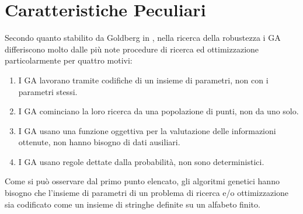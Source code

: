 \section{Caratteristiche Peculiari}
Secondo quanto stabilito da Goldberg in \cite{goldberg1}, nella ricerca della robustezza i GA differiscono molto dalle pi\`u note procedure di ricerca ed ottimizzazione particolarmente per quattro motivi:
\begin{enumerate}
    \item I GA lavorano tramite codifiche di un insieme di parametri, non con i parametri stessi.
    \item I GA cominciano la loro ricerca da una popolazione di punti, non da uno solo.
    \item I GA usano una funzione oggettiva per la valutazione delle informazioni ottenute, non hanno bisogno di dati ausiliari.
    \item I GA usano regole dettate dalla probabilit\`a, non sono deterministici.
\end{enumerate}
Come si pu\`o osservare dal primo punto elencato, gli algoritmi genetici hanno bisogno che l'insieme di parametri di un problema di ricerca e/o ottimizzazione sia codificato come un insieme di stringhe definite su un alfabeto finito.

